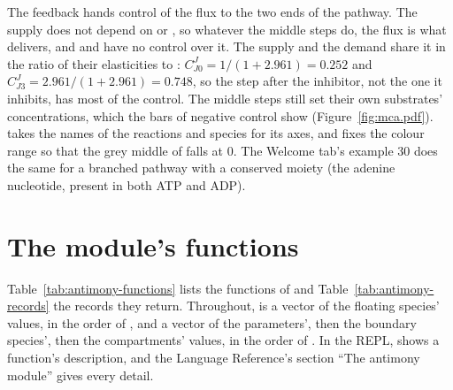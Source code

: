 \documentclass[11pt,a4paper,openany]{report}
\begin{document}
{{The feedback hands control of the flux to the two ends of the pathway. The
supply  does not depend on  or , so whatever the
middle steps do, the flux is what  delivers, and  and
 have no control over it. The supply and the demand  share
it in the ratio of their elasticities to :
$C^J_{J0} = 1/(1 + 2.961) = 0.252$ and $C^J_{J3} = 2.961/(1 + 2.961) = 0.748$,
so the step after the inhibitor, not the one it inhibits, has most of the
control. The middle steps still set their own substrates' concentrations,
which the bars of negative control show (Figure~\ref{fig:mca.pdf}).
 takes the names of the reactions and species for its axes,
and  fixes the colour range so that the grey middle of
 falls at 0. The Welcome tab's example 30 does the same for a
branched pathway with a conserved moiety (the adenine nucleotide, present
in both ATP and ADP).


\section{The module's functions}\label{sec:antimony-functions}

Table~\ref{tab:antimony-functions} lists the functions of 
and Table~\ref{tab:antimony-records} the records they return. Throughout,
 is a vector of the floating species' values, in the order of
, and  a vector of the parameters', then
the boundary species', then the compartments' values, in the order of
. In the REPL,  shows a
function's description, and the Language Reference's section ``The
antimony module'' gives every detail.

}}
\end{document}
